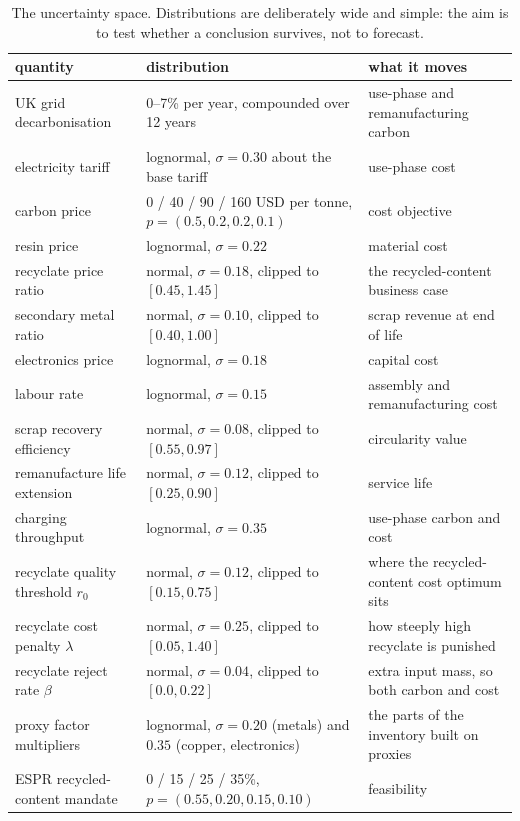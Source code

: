 \documentclass[11pt,a4paper]{article}
\begin{document}
\begin{table}[t]
\centering\small
\caption{The uncertainty space. Distributions are deliberately wide and simple:
the aim is to test whether a conclusion survives, not to forecast.}
\label{tab:scen}
\begin{tabular}{p{4.2cm}p{6.6cm}p{4.6cm}}
\toprule
quantity & distribution & what it moves \\
\midrule
UK grid decarbonisation & 0--7\% per year, compounded over 12 years & use-phase and remanufacturing carbon \\
electricity tariff & lognormal, $\sigma=0.30$ about the base tariff & use-phase cost \\
carbon price & 0 / 40 / 90 / 160 USD per tonne, $p=(0.5,0.2,0.2,0.1)$ & cost objective \\
resin price & lognormal, $\sigma=0.22$ & material cost \\
recyclate price ratio & normal, $\sigma=0.18$, clipped to $[0.45,1.45]$ & the recycled-content business case \\
secondary metal ratio & normal, $\sigma=0.10$, clipped to $[0.40,1.00]$ & scrap revenue at end of life \\
electronics price & lognormal, $\sigma=0.18$ & capital cost \\
labour rate & lognormal, $\sigma=0.15$ & assembly and remanufacturing cost \\
scrap recovery efficiency & normal, $\sigma=0.08$, clipped to $[0.55,0.97]$ & circularity value \\
remanufacture life extension & normal, $\sigma=0.12$, clipped to $[0.25,0.90]$ & service life \\
charging throughput & lognormal, $\sigma=0.35$ & use-phase carbon and cost \\
recyclate quality threshold $r_0$ & normal, $\sigma=0.12$, clipped to $[0.15,0.75]$ & where the recycled-content cost optimum sits \\
recyclate cost penalty $\lambda$ & normal, $\sigma=0.25$, clipped to $[0.05,1.40]$ & how steeply high recyclate is punished \\
recyclate reject rate $\beta$ & normal, $\sigma=0.04$, clipped to $[0.0,0.22]$ & extra input mass, so both carbon and cost \\
proxy factor multipliers & lognormal, $\sigma=0.20$ (metals) and $0.35$ (copper, electronics) & the parts of the inventory built on proxies \\
ESPR recycled-content mandate & 0 / 15 / 25 / 35\%, $p=(0.55,0.20,0.15,0.10)$ & feasibility \\
\bottomrule
\end{tabular}
\end{table}
\end{document}
